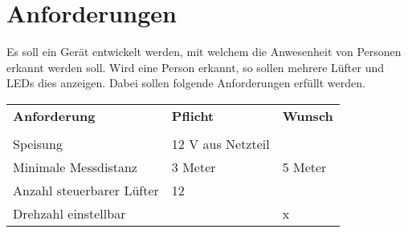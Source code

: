



\section{Anforderungen}
Es soll ein Gerät entwickelt werden, mit welchem die Anwesenheit von Personen 
erkannt werden soll. Wird eine Person erkannt, so sollen mehrere Lüfter und 
LEDs dies anzeigen. Dabei sollen folgende Anforderungen erfüllt werden. 

\begin{table}[h!]
  \begin{tabular}{@{}p{}p{}p{}}
    \rowcolor{white} \textbf{Anforderung}     & \textbf{Pflicht} & \textbf{Wunsch}\\
                                              &                  &                \\
    \rowcolor{white} Speisung                 & 12 V aus Netzteil&                \\
    \rowcolor{lgray} Minimale Messdistanz     & 3 Meter          & 5 Meter        \\
    \rowcolor{white} Anzahl steuerbarer Lüfter& 12               &                \\
    \rowcolor{lgray} Drehzahl einstellbar     &                  & x              \\
  \end{tabular}
  \label{tab:anforderungen}
\end{table}
